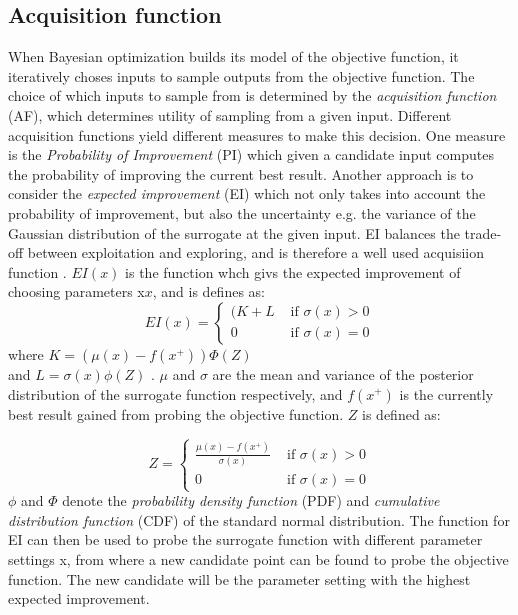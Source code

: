 \subsection{Acquisition function}\label{sec:acquisition-function}
When Bayesian optimization builds its model of the objective function, it iteratively choses inputs to sample outputs from the objective function. The choice of which inputs to sample from is determined by the \emph{acquisition function} (AF), which determines utility of sampling from a given input. Different acquisition functions yield different measures to make this decision. One measure is the \emph{Probability of Improvement} (PI) which given a candidate input computes the probability of improving the current best result.  Another approach is to consider the \emph{expected improvement} (EI) which not only takes into account the probability of improvement, but also the uncertainty e.g. the variance of the Gaussian distribution of the surrogate at the given input.
EI balances the trade-off between exploitation and exploring, and is therefore a well used acquisiion function \citet{brochu2010tutorial}. $EI(x)$ is the function whch givs the expected improvement of choosing parameters x$x$, and is defines as:
\begin{equation}
\label{eq:expected-improvement}
EI(x) =
\begin{cases}
   (K + L & \text{ if } \sigma(x) > 0\\
   0 	  & \text{ if } \sigma(x) = 0
\end{cases}
\end{equation}
where $K = (\mu(x) - f(x^+))\Phi(Z)$ \\and $L = \sigma(x)\phi(Z)$ .
$\mu$ and $\sigma$ are the mean and variance of the posterior distribution of the surrogate function respectively, and $f(x^+)$ is the currently best result gained from probing the objective function. $Z$ is defined as:

\begin{equation}
\label{eq:expect-z}
Z =
\begin{cases}
\frac{\mu(x) - f(x^+)}{\sigma(x)} & \text{ if } \sigma(x) > 0\\
0 								  & \text{ if } \sigma(x) = 0
\end{cases}
\end{equation}
$\phi$ and $\Phi$ denote the \emph{probability density function} (PDF) and \emph{cumulative distribution function} (CDF) of the standard normal distribution.
The function for EI can then be used to probe the surrogate function with different parameter settings x, from where a new candidate point can be found to probe the objective function. The new candidate will be the parameter setting with the highest expected improvement.  



